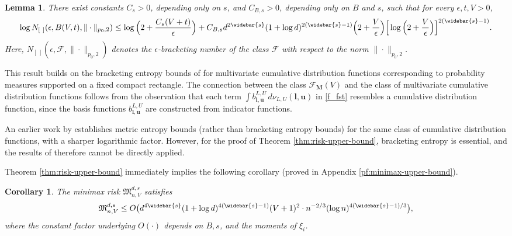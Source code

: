 \documentclass[10pt]{article}
\newtheorem{lemma}{Lemma}
\newtheorem{corollary}{Corollary}
\newcommand{\F}{{\mathcal{F}}}
\newcommand{\minimax}{{\mathfrak{M}^{d, s}_{n, V}}}
\newcommand{\lbf}{{\mathbf{l}}}
\newcommand{\ubf}{{\mathbf{u}}}
\newcommand{\Mbf}{{\mathbf{M}}}
\begin{document}
\begin{lemma}\label{lem:bracketing-entropy-bound}
There exist constants $C_s > 0$, depending only on $s$, and 
$C_{B, s} > 0$, depending only on $B$ and $s$, such that 
for every $\epsilon, t, V > 0$,
\begin{equation*}
    \log N_{[ \ ]}(\epsilon, B(V, t), \| \cdot \|_{p_0, 2}) 
    \le \log\Big(2 + \frac{C_s(V + t)}{\epsilon}\Big) 
    + C_{B, s} d^{2\widebar{s}}(1 + \log d)^{2(\widebar{s} - 1)}
    \Big(2 + \frac{V}{\epsilon}\Big) 
    \Big[\log\Big(2 + \frac{V}{\epsilon}\Big)\Big]^{2(\widebar{s} - 1)}.
\end{equation*}
Here, $N_{[ \ ]}(\epsilon, \F, \| \cdot \|_{p_0, 2})$ denotes the 
$\epsilon$-bracketing number of the class $\F$ with respect to 
the norm $\| \cdot \|_{p_0, 2}$.
\end{lemma}

This result builds on the bracketing entropy bounds of 
\citet{gao2013bracketing} for multivariate cumulative distribution 
functions corresponding to probability measures supported on a fixed 
compact rectangle. The connection between the class $\F_{\Mbf}(V)$ 
and the class of multivariate cumulative distribution 
functions follows from the observation that each term 
$\int b^{L, U}_{\lbf, \ubf} \, d\nu_{L, U}(\lbf, \ubf)$ in 
\eqref{f_fst} resembles a cumulative distribution function, since 
the basis functions $b^{L, U}_{\lbf, \ubf}$ are constructed from 
indicator functions.

An earlier work by \citet{blei2007metric} establishes metric entropy 
bounds (rather than bracketing entropy bounds) for the same class of
cumulative distribution functions, with a sharper logarithmic factor. 
However, for the proof of Theorem \ref{thm:risk-upper-bound}, 
bracketing entropy is essential, and the results of 
\citet{blei2007metric} therefore cannot be directly applied.
  
Theorem \ref{thm:risk-upper-bound} immediately implies the following
corollary (proved in Appendix \ref{pf:minimax-upper-bound}). 

\begin{corollary}\label{cor:minimax-upper-bound}
    The minimax risk $\minimax$ satisfies
    \begin{equation*}
        \minimax
        \le O\big(d^{4\widebar{s}}(1 + \log d)^{4(\widebar{s} - 1)} 
        (V + 1)^2 \cdot n^{-2/3} (\log n)^{4(\widebar{s} - 1)/3}\big),
    \end{equation*}
    where the constant factor underlying $O(\cdot)$ depends on 
    $B, s$, and the moments of $\xi_i$.
\end{corollary}
\end{document}
